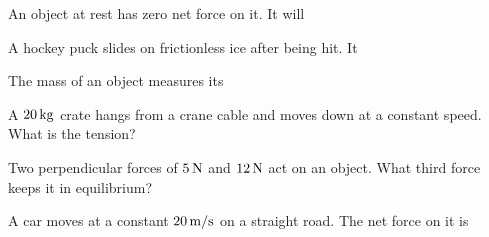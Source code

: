 \begin{exo}{}
An object at rest has zero net force on it. It will
\end{exo}
\begin{exo}{}
A hockey puck slides on frictionless ice after being hit. It
\end{exo}
\begin{exo}{}
The mass of an object measures its
\end{exo}
\begin{exo}{}
A $20\,\mathrm{kg}$ crate hangs from a crane cable and moves down at a constant speed. What is the tension?
\end{exo}
\begin{exo}{}
Two perpendicular forces of $5\,\mathrm{N}$ and $12\,\mathrm{N}$ act on an object. What third force keeps it in equilibrium?
\choices{$7\N$}{$17\N$}{$13\N$}{$60\N$}
\end{exo}
\begin{exo}{}
A car moves at a constant $20\,\mathrm{m/s}$ on a straight road. The net force on it is
\end{exo}

